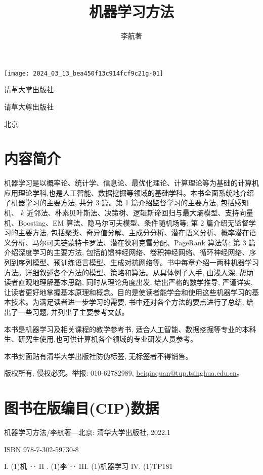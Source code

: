 \documentclass[10pt]{article}
\title{机器学习方法 }
\author{李航著}
\date{}
\begin{document}
\begin{CJK*}{UTF8}{bsmi}
\maketitle
\begin{center}
\texttt{[image: 2024\_03\_13\_bea450f13c914fcf9c21g-01]}
\end{center}

请革大掌出版社

请草大尊出版社

北京

\section*{内容简介}
机器学习是以概率论、统计学、信息论、最优化理论、计算理论等为基础的计算机应用理论学科,也是人工智能、数据挖掘等领域的基础学科。本书全面系统地介绍了机器学习的主要方法, 共分 3 篇。第 1 篇介绍监督学习的主要方法, 包括感知机、 $k$ 近邻法、朴素贝叶斯法、决策树、逻辑斯谛回归与最大熵模型、支持向量机、Boosting、EM 算法、隐马尔可夫模型、条件随机场等; 第 2 篇介绍无监督学习的主要方法, 包括聚类、奇异值分解、主成分分析、潜在语义分析、概率潜在语义分析、马尔可夫链蒙特卡罗法、潜在狄利克雷分配、PageRank 算法等; 第 3 篇介绍深度学习的主要方法, 包括前馈神经网络、卷积神经网络、循环神经网络、序列到序列模型、预训练语言模型、生成对抗网络等。书中每章介绍一两种机器学习方法。详细叙述各个方法的模型、策略和算法。从具体例子入手, 由浅入深, 帮助读者直观地理解基本思路, 同时从理论角度出发, 给出严格的数学推导, 严谨详实, 让读者更好地掌握基本原理和概念。目的是使读者能学会和使用这些机器学习的基本技术。为满足读者进一步学习的需要, 书中还对各个方法的要点进行了总结, 给出了一些习题, 并列出了主要参考文献。

本书是机器学习及相关课程的教学参考书, 适合人工智能、数据挖掘等专业的本科生、研究生使用,也可供计算机各个领域的专业研发人员参考。

本书封面贴有清华大学出版社防伪标签, 无标签者不得销售。

版权所有, 侵权必究。举报: 010-62782989, \href{mailto:beiqinquan@tup.tsinghua.edu.cn}{beiqinquan@tup.tsinghua.edu.cn}。

\section*{图书在版编目(CIP)数据}
机器学习方法/李航著—北京: 清华大学出版社, 2022.1

ISBN 978-7-302-59730-8

I. (1)机 ‥ II . (1)李 ‥ III. (1)机器学习 IV. (1)TP181


\end{CJK*}
\end{document}
